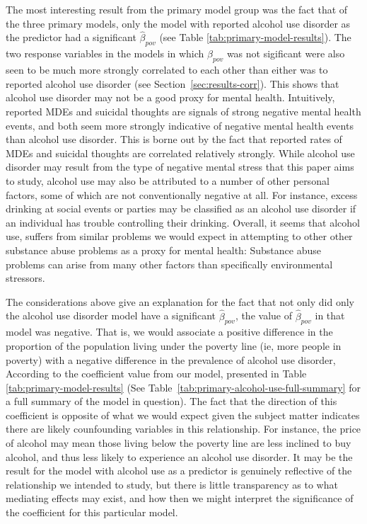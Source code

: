 \documentclass{article}
\begin{document}
The most interesting result from the primary model group
was the fact that of the three primary models,
only the model with reported alcohol use disorder
as the predictor had a significant $\hat{\beta}_{pov}$
(see Table \ref{tab:primary-model-results}).
The two response variables in the models in which
$\hat{\beta}_{pov}$ was not sigificant were also
seen to be much more strongly correlated to each other
than either was to reported alcohol use disorder
(see Section~\ref{sec:results-corr}).
This shows that alcohol use disorder may not
be a good proxy for mental health.
Intuitively, reported MDEs and suicidal thoughts
are signals of strong negative mental health events,
and both seem more strongly indicative of negative mental health events
than alcohol use disorder.
This is borne out by the fact that
reported rates of MDEs and suicidal thoughts
are correlated relatively strongly.
While alcohol use disorder may result from the type of negative
mental stress that this paper aims to study,
alcohol use may also be attributed to a number
of other personal factors, some of which are not conventionally
negative at all.
For instance, excess drinking at social events or parties
may be classified as an alcohol use disorder if
an individual has trouble controlling their drinking.
Overall, it seems that alcohol use,
suffers from similar problems we would expect in attempting
to other other substance abuse problems
as a proxy for mental health:
Substance abuse problems can arise from many other
factors than specifically environmental stressors.

The considerations above give an explanation for the fact that
not only did only the alcohol use disorder model have a
significant $\hat{\beta}_{pov}$, the value of $\hat{\beta}_{pov}$
in that model was negative.
That is, we would associate a positive difference in
the proportion of the population living under the poverty line
(ie, more people in poverty)
with a negative difference in the prevalence of alcohol use disorder,
According to the coefficient value from our model, presented in
Table \ref{tab:primary-model-results}
(See Table~\ref{tab:primary-alcohol-use-full-summary} for a full
summary of the model in question).
The fact that the direction of this coefficient is opposite of
what we would expect given the subject matter
indicates there are likely counfounding variables in this relationship.
For instance, the price of alcohol may mean those living below
the poverty line are less inclined to buy alcohol,
and thus less likely to experience an alcohol use disorder.
It may be the result for the model with alcohol use as
a predictor is genuinely reflective of the relationship
we intended to study, but there is little transparency
as to what mediating effects may exist,
and how then we might interpret the significance of
the coefficient for this particular model.
\end{document}

